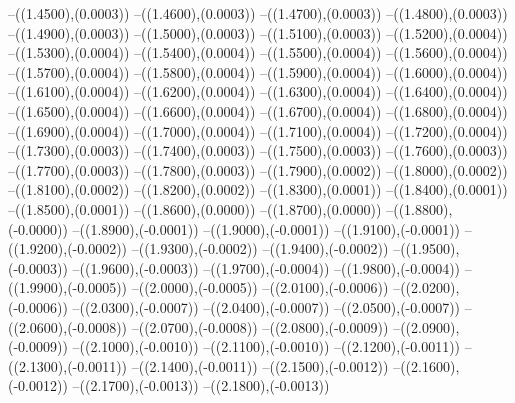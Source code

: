 {	--({\sx*(1.4500)},{\sy*(0.0003)})
	--({\sx*(1.4600)},{\sy*(0.0003)})
	--({\sx*(1.4700)},{\sy*(0.0003)})
	--({\sx*(1.4800)},{\sy*(0.0003)})
	--({\sx*(1.4900)},{\sy*(0.0003)})
	--({\sx*(1.5000)},{\sy*(0.0003)})
	--({\sx*(1.5100)},{\sy*(0.0003)})
	--({\sx*(1.5200)},{\sy*(0.0004)})
	--({\sx*(1.5300)},{\sy*(0.0004)})
	--({\sx*(1.5400)},{\sy*(0.0004)})
	--({\sx*(1.5500)},{\sy*(0.0004)})
	--({\sx*(1.5600)},{\sy*(0.0004)})
	--({\sx*(1.5700)},{\sy*(0.0004)})
	--({\sx*(1.5800)},{\sy*(0.0004)})
	--({\sx*(1.5900)},{\sy*(0.0004)})
	--({\sx*(1.6000)},{\sy*(0.0004)})
	--({\sx*(1.6100)},{\sy*(0.0004)})
	--({\sx*(1.6200)},{\sy*(0.0004)})
	--({\sx*(1.6300)},{\sy*(0.0004)})
	--({\sx*(1.6400)},{\sy*(0.0004)})
	--({\sx*(1.6500)},{\sy*(0.0004)})
	--({\sx*(1.6600)},{\sy*(0.0004)})
	--({\sx*(1.6700)},{\sy*(0.0004)})
	--({\sx*(1.6800)},{\sy*(0.0004)})
	--({\sx*(1.6900)},{\sy*(0.0004)})
	--({\sx*(1.7000)},{\sy*(0.0004)})
	--({\sx*(1.7100)},{\sy*(0.0004)})
	--({\sx*(1.7200)},{\sy*(0.0004)})
	--({\sx*(1.7300)},{\sy*(0.0003)})
	--({\sx*(1.7400)},{\sy*(0.0003)})
	--({\sx*(1.7500)},{\sy*(0.0003)})
	--({\sx*(1.7600)},{\sy*(0.0003)})
	--({\sx*(1.7700)},{\sy*(0.0003)})
	--({\sx*(1.7800)},{\sy*(0.0003)})
	--({\sx*(1.7900)},{\sy*(0.0002)})
	--({\sx*(1.8000)},{\sy*(0.0002)})
	--({\sx*(1.8100)},{\sy*(0.0002)})
	--({\sx*(1.8200)},{\sy*(0.0002)})
	--({\sx*(1.8300)},{\sy*(0.0001)})
	--({\sx*(1.8400)},{\sy*(0.0001)})
	--({\sx*(1.8500)},{\sy*(0.0001)})
	--({\sx*(1.8600)},{\sy*(0.0000)})
	--({\sx*(1.8700)},{\sy*(0.0000)})
	--({\sx*(1.8800)},{\sy*(-0.0000)})
	--({\sx*(1.8900)},{\sy*(-0.0001)})
	--({\sx*(1.9000)},{\sy*(-0.0001)})
	--({\sx*(1.9100)},{\sy*(-0.0001)})
	--({\sx*(1.9200)},{\sy*(-0.0002)})
	--({\sx*(1.9300)},{\sy*(-0.0002)})
	--({\sx*(1.9400)},{\sy*(-0.0002)})
	--({\sx*(1.9500)},{\sy*(-0.0003)})
	--({\sx*(1.9600)},{\sy*(-0.0003)})
	--({\sx*(1.9700)},{\sy*(-0.0004)})
	--({\sx*(1.9800)},{\sy*(-0.0004)})
	--({\sx*(1.9900)},{\sy*(-0.0005)})
	--({\sx*(2.0000)},{\sy*(-0.0005)})
	--({\sx*(2.0100)},{\sy*(-0.0006)})
	--({\sx*(2.0200)},{\sy*(-0.0006)})
	--({\sx*(2.0300)},{\sy*(-0.0007)})
	--({\sx*(2.0400)},{\sy*(-0.0007)})
	--({\sx*(2.0500)},{\sy*(-0.0007)})
	--({\sx*(2.0600)},{\sy*(-0.0008)})
	--({\sx*(2.0700)},{\sy*(-0.0008)})
	--({\sx*(2.0800)},{\sy*(-0.0009)})
	--({\sx*(2.0900)},{\sy*(-0.0009)})
	--({\sx*(2.1000)},{\sy*(-0.0010)})
	--({\sx*(2.1100)},{\sy*(-0.0010)})
	--({\sx*(2.1200)},{\sy*(-0.0011)})
	--({\sx*(2.1300)},{\sy*(-0.0011)})
	--({\sx*(2.1400)},{\sy*(-0.0011)})
	--({\sx*(2.1500)},{\sy*(-0.0012)})
	--({\sx*(2.1600)},{\sy*(-0.0012)})
	--({\sx*(2.1700)},{\sy*(-0.0013)})
	--({\sx*(2.1800)},{\sy*(-0.0013)})
}
